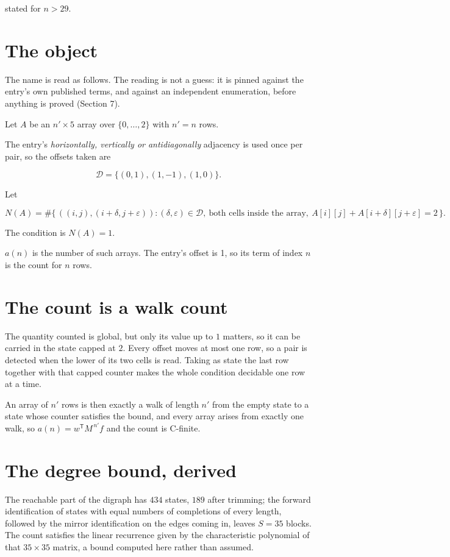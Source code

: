 \documentclass[11pt]{article}
\theoremstyle{definition}
\begin{document}
stated for $n > 29$.

\section{The object}

The name is read as follows. The reading is not a guess: it is pinned against the entry's own published terms, and against an independent enumeration, before anything is proved (Section 7).

Let $A$ be an $n' \times 5$ array over $\{0,\dots,2\}$ with $n' = n$ rows.

The entry's {\itshape horizontally, vertically or antidiagonally} adjacency is used once per pair, so the offsets taken are

\[\mathcal{D} = \{(0,1), (1,-1), (1,0)\}.\]

Let

\[N(A) = \#\bigl\{\,((i,j),(i{+}\delta,j{+}\varepsilon)) : (\delta,\varepsilon) \in \mathcal{D},\ \text{both cells inside the array},\ A[i][j] + A[i{+}\delta][j{+}\varepsilon] = 2\,\bigr\}.\]

The condition is $N(A) = 1$.

$a(n)$ is the number of such arrays. The entry's offset is 1, so its term of index $n$ is the count for $n$ rows.

\section{The count is a walk count}

The quantity counted is global, but only its value up to $1$ matters, so it can be carried in the state capped at $2$. Every offset moves at most one row, so a pair is detected when the lower of its two cells is read. Taking as state the last row together with that capped counter makes the whole condition decidable one row at a time.

An array of $n'$ rows is then exactly a walk of length $n'$ from the empty state to a state whose counter satisfies the bound, and every array arises from exactly one walk, so $a(n) = w^{\mathsf T}M^{\,n'}f$ and the count is C-finite.

\section{The degree bound, derived}

The reachable part of the digraph has $434$ states, $189$ after trimming; the forward identification of states with equal numbers of completions of every length, followed by the mirror identification on the edges coming in, leaves $S = 35$ blocks. The count satisfies the linear recurrence given by the characteristic polynomial of that $35\times35$ matrix, a bound computed here rather than assumed.
\end{document}
